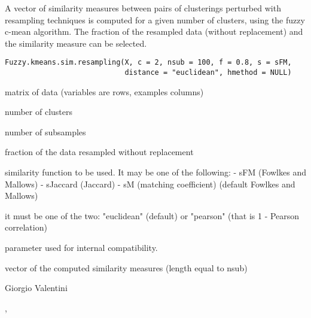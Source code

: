\documentclass{article}
\begin{document}
\begin{Description}\relax
A vector of similarity measures between pairs of clusterings perturbed with resampling techniques is computed for a given number of clusters,
using the fuzzy c-mean algorithm.
The fraction of the resampled data (without replacement) and the similarity measure can be selected.
\end{Description}
\begin{Usage}
\begin{verbatim}
Fuzzy.kmeans.sim.resampling(X, c = 2, nsub = 100, f = 0.8, s = sFM, 
                            distance = "euclidean", hmethod = NULL)
\end{verbatim}
\end{Usage}
\begin{Arguments}
\begin{ldescription}
\item[\code{X}] matrix of data (variables are rows, examples columns) 
\item[\code{c}] number of clusters 
\item[\code{nsub}] number of subsamples 
\item[\code{f}] fraction of the data resampled without replacement 
\item[\code{s}] similarity function to be used. It may be one of the following: 
- sFM (Fowlkes and Mallows)
- sJaccard (Jaccard)
- sM (matching coefficient)
(default Fowlkes and Mallows) 
\item[\code{distance}] it must be one of the two: "euclidean" (default) or "pearson" (that is 1 - Pearson correlation) 
\item[\code{hmethod}] parameter used for internal compatibility. 
\end{ldescription}
\end{Arguments}
\begin{Value}
vector of the computed similarity measures (length equal to nsub)
\end{Value}
\begin{Author}\relax
Giorgio Valentini 
\end{Author}
\begin{SeeAlso}\relax
{}, 
\end{SeeAlso}
\end{document}
